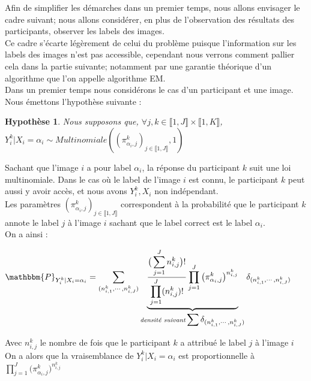 \documentclass[frenchb]{report}
\newcommand{\1}{\mathbbm{1}}
\newcommand{\prob}{\mathbbm{P}}
\newtheorem{hyp}{Hypothèse}
\theoremstyle{definition}\newtheorem{defn}{Définition}
\theoremstyle{definition}\newtheorem{exm}{Exemple}
\theoremstyle{definition}\newtheorem{nota}{Notation}
\theoremstyle{definition}\newtheorem{rem}{Remarque}
\begin{document}
Afin de simplifier les démarches dans un premier temps, nous allons envisager le cadre suivant; nous allons considérer, en plus de l'observation des résultats des participants, observer les labels des images. \\
Ce cadre s'écarte légèrement de celui du problème puisque l'information sur les labels des images n'est pas accessible, cependant nous verrons comment pallier cela dans la partie suivante; notamment par une garantie théorique d'un algorithme que l'on appelle algorithme EM. \\
Dans un premier temps nous considérons le cas d'un participant et une image.\\

Nous émettons l'hypothèse suivante : 

\begin{hyp}
	Nous supposons que, $\forall j,k \in \llbracket 1,J \rrbracket \times \llbracket 1,K \rrbracket$, $Y^k_i | X_i = \alpha_i \sim Multinomiale((\pi^k_{\alpha_i,j})_{j \in \llbracket 1,J \rrbracket},1)$
\end{hyp}

Sachant que l'image $i$ a pour label $\alpha_i$, la réponse du participant $k$ suit une loi multinomiale. Dans le cas où le label de l'image $i$ est connu, le participant $k$ peut aussi y avoir accès, et nous avons $Y^k_i, X_i $ non indépendant. \\

Les paramètres $(\pi^k_{\alpha_i,j})_{j \in \llbracket 1,J \rrbracket}$ correspondent à la probabilité que le participant $k$  annote le label $j$ à l'image $i$ sachant que le label correct est le label $\alpha_i$.\\

\newpage
On a ainsi :

\begin{center}
$\prob_{Y^k_i|X_i = \alpha_i} = \displaystyle \sum_{(n^k_{i,1}, \cdots, n^k_{i,J})} \underbrace{\frac{\big(\displaystyle \sum_{j=1}^J n^k_{i,j}\big)!}{\displaystyle \prod_{j=1}^J (n^k_{i,j})!}\displaystyle \prod_{j=1}^J \big(\pi^k_{\alpha_i,j}\big)^{n^k_{i,j}}}_{\textit{densité suivant} \displaystyle \sum \delta_{(n^k_{i,1}, \cdots, n^k_{i,J})}} \delta_{(n^k_{i,1}, \cdots, n^k_{i,J})}$
\end{center}

Avec $n^k_{i,j}$ le nombre de fois que le participant $k$ a attribué le label $j$ à l'image $i$\\

On a alors que la vraisemblance de $Y^k_i | X_i = \alpha_i$ est proportionnelle à $\displaystyle \prod_{j=1}^J \big(\pi^k_{\alpha_i,j}\big)^{n^k_{i,j}}$\\
\end{document}

